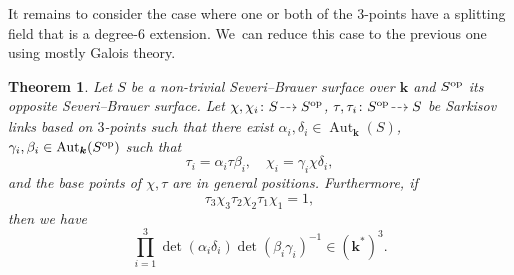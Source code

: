 \documentclass[JEP,XML,SOM,Unicode,NoFloatCountersInSection, NoEqCountersInSection,published]{cedram}
\newcommand{\dradpl}{{\hspace*{-2mm}\begin{tikzcd}[ampersand replacement=\&,column sep = scriptsize]\mbox{}\ar[r,dashed]\&\mbox{}\end{tikzcd}\hspace*{-2mm}}}
\newcommand{\dratst}{{\hspace*{-2.5mm}\begin{tikzcd}[ampersand replacement=\&,column sep = small]\mbox{}\ar[r,dashed]\&\mbox{}\end{tikzcd}\hspace*{-2mm}}}
\let\drascst\dratst
\newcommand{\dra}{\mathchoice{\dradpl}{\dratst}{\drascst}{\drascst}}
\newcommand{\op}{\textup{op}}
\newtheorem{theorem}{Theorem}[section]
\theoremstyle{definition}
\newcommand{\kk}{{\boldsymbol{k}}}
\DeclareMathOperator{\Aut}{Aut}
\begin{document}
It remains to consider the case where one or both of the $3$\nobreakdash-points have a splitting field that is a degree-$6$ extension. We~can reduce this case to the previous one using mostly Galois theory.

\begin{theorem} \label{MainA}
Let $S$ be a non-trivial Severi--Brauer surface over $\kk$ and $S^{\op}$ its opposite Severi--Brauer surface. Let $\chi, \chi_i \colon S \dra S^{\op}$, $\tau, \tau_i \colon S^{\op} \dra S$ be Sarkisov links based on $3$\nobreakdash-points such that there exist $\alpha_i, \delta_i \in \Aut_{\kk}(S)$, $\gamma_i, \beta_i \in \Aut_{\kk}(S^{\op})$ such that
\[
\tau_i = \alpha_i \tau \beta_i, \quad\chi_i = \gamma_i \chi \delta_i,
\]
and the base points of $\chi, \tau$ are in general positions. Furthermore, if
\[
\tau_3 \chi_3 \tau_2 \chi_2 \tau_1 \chi_1 = 1,
\]
then we have
\[
\prod_{i=1}^3 \det(\alpha_i\delta_i)\det(\beta_i\gamma_i)^{-1} \in (\kk^*)^3.
\]
\end{theorem}
\end{document}
